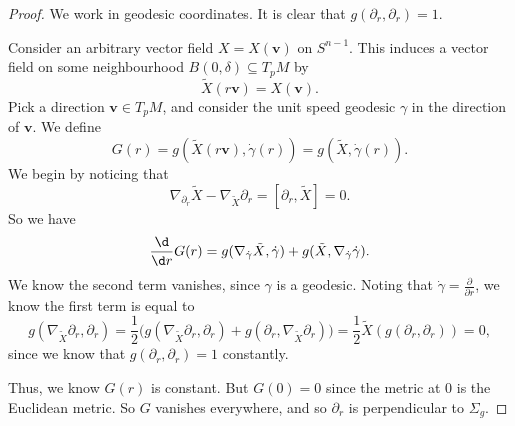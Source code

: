 \documentclass[a4paper]{article}
\begin{document}
\begin{proof}
  We work in geodesic coordinates. It is clear that $g(\partial_r, \partial_r) = 1$.

  Consider an arbitrary vector field $X = X(\mathbf{v})$ on $S^{n - 1}$. This induces a vector field on some neighbourhood $B(0, \delta) \subseteq T_p M$ by
  \[
    \tilde{X}(r\mathbf{v}) = X(\mathbf{v}).
  \]
  Pick a direction $\mathbf{v} \in T_pM$, and consider the unit speed geodesic $\gamma$ in the direction of $\mathbf{v}$. We define
  \[
    G(r) = g(\tilde{X}(r\mathbf{v}), \dot{\gamma}(r)) = g(\tilde{X}, \dot{\gamma}(r)).
  \]
  We begin by noticing that
  \[
    \nabla_{\partial_r} \tilde{X} - \nabla_{\tilde{X}} \partial_r = [\partial_r , \tilde{X}] = 0.
  \]
  So we have
  \[
    \frac{\d}{\d r} G(r) = g(\nabla_{\dot{\gamma}} \tilde{X}, \dot{\gamma}) + g(\tilde{X}, \nabla_{\dot{\gamma}} \dot{\gamma}).
  \]
  We know the second term vanishes, since $\gamma$ is a geodesic. Noting that $\dot{\gamma} = \frac{\partial}{\partial r}$, we know the first term is equal to
  \[
    g(\nabla_{\tilde{X}} \partial_r, \partial_r) = \frac{1}{2} \Big(g(\nabla_{\tilde{X}} \partial_r, \partial_r) + g( \partial_r, \nabla_{\tilde{X}}\partial_r)\Big) = \frac{1}{2} \tilde{X} (g(\partial_r, \partial_r)) = 0,
  \]
  since we know that $g(\partial_r, \partial_r) = 1$ constantly.

  Thus, we know $G(r)$ is constant. But $G(0) = 0$ since the metric at $0$ is the Euclidean metric. So $G$ vanishes everywhere, and so $\partial_r$ is perpendicular to $\Sigma_g$.


\end{proof}
\end{document}
